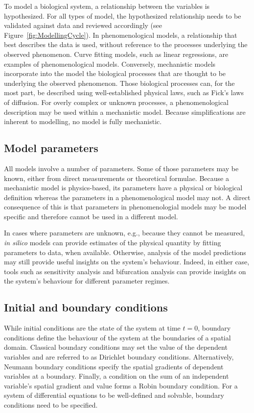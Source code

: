 \documentclass{article}
\begin{document}
To model a biological system, a relationship between the variables is hypothesized.
For all types of model, the hypothesized relationship needs to be validated against data and reviewed accordingly (see Figure~\ref{fig:ModellingCycle}).
In phenomenological models, a relationship that best describes the data is used, without reference to the processes underlying the observed phenomenon.
Curve fitting models, such as linear regressions, are examples of phenomenological models.
Conversely, mechanistic models incorporate into the model the biological processes that are thought to be underlying the observed phenomenon.
Those biological processes can, for the most part, be described using well-established physical laws, such as Fick's laws of diffusion.
For overly complex or unknown processes, a phenomenological description may be used within a mechanistic model.
Because simplifications are inherent to modelling, no model is fully mechanistic. %

\subsection{Model parameters}
All models involve a number of parameters.
Some of those parameters may be known, either from direct measurements or theoretical formulae.
Because a mechanistic model is physics-based, its parameters have a physical or biological definition whereas the parameters in a phenomenological model may not.
A direct consequence of this is that parameters in phenomenologial models may be model specific and therefore cannot be used in a different model.

In cases where parameters are unknown, e.g., because they cannot be measured, \textit{in silico} models can provide estimates of the physical quantity by fitting parameters to data, when available.
Otherwise, analysis of the model predictions may still provide useful insights on the system's behaviour.
Indeed, in either case, tools such as sensitivity analysis and bifurcation analysis can provide insights on the system's behaviour for different parameter regimes.


\subsection{Initial and boundary conditions}

While initial conditions are the state of the system at time $t=0$, boundary conditions define the behaviour of the system at the boundaries of a spatial domain.
Classical boundary conditions may set the value of the dependent variables and are referred to as Dirichlet boundary conditions.
Alternatively, Neumann boundary conditions specify the spatial gradients of dependent variables at a boundary.
Finally, a condition on the sum of an independent variable's spatial gradient and value forms a Robin boundary condition.
For a system of differential equations to be well-defined and solvable, boundary conditions need to be specified.
\end{document}
